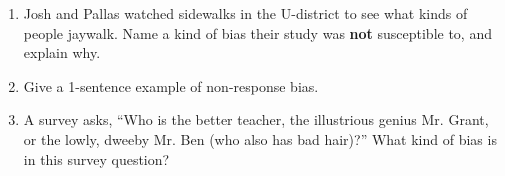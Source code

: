\documentclass[12pt]{article}
\begin{document}
\begin{enumerate}[itemsep=-1ex]
\item Josh and Pallas watched sidewalks in the U-district to see what kinds of people jaywalk. Name a kind of bias their study was \textbf{not} susceptible to, and explain why. \vspace{5mm}

\item Give a 1-sentence example of non-response bias. \vspace{10mm}

	\item A survey asks, ``Who is the better teacher, the illustrious genius Mr. Grant, or the lowly, dweeby Mr. Ben (who also has bad hair)?'' What kind of bias is in this survey question?

\end{enumerate}	
\end{document}
